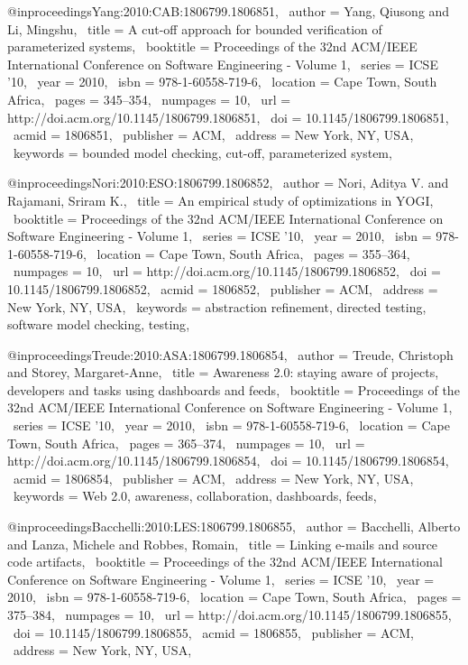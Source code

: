@inproceedings{Yang:2010:CAB:1806799.1806851,
 author = {Yang, Qiusong and Li, Mingshu},
 title = {A cut-off approach for bounded verification of parameterized systems},
 booktitle = {Proceedings of the 32nd ACM/IEEE International Conference on Software Engineering - Volume 1},
 series = {ICSE '10},
 year = {2010},
 isbn = {978-1-60558-719-6},
 location = {Cape Town, South Africa},
 pages = {345--354},
 numpages = {10},
 url = {http://doi.acm.org/10.1145/1806799.1806851},
 doi = {10.1145/1806799.1806851},
 acmid = {1806851},
 publisher = {ACM},
 address = {New York, NY, USA},
 keywords = {bounded model checking, cut-off, parameterized system},
} 

@inproceedings{Nori:2010:ESO:1806799.1806852,
 author = {Nori, Aditya V. and Rajamani, Sriram K.},
 title = {An empirical study of optimizations in YOGI},
 booktitle = {Proceedings of the 32nd ACM/IEEE International Conference on Software Engineering - Volume 1},
 series = {ICSE '10},
 year = {2010},
 isbn = {978-1-60558-719-6},
 location = {Cape Town, South Africa},
 pages = {355--364},
 numpages = {10},
 url = {http://doi.acm.org/10.1145/1806799.1806852},
 doi = {10.1145/1806799.1806852},
 acmid = {1806852},
 publisher = {ACM},
 address = {New York, NY, USA},
 keywords = {abstraction refinement, directed testing, software model checking, testing},
} 

@inproceedings{Treude:2010:ASA:1806799.1806854,
 author = {Treude, Christoph and Storey, Margaret-Anne},
 title = {Awareness 2.0: staying aware of projects, developers and tasks using dashboards and feeds},
 booktitle = {Proceedings of the 32nd ACM/IEEE International Conference on Software Engineering - Volume 1},
 series = {ICSE '10},
 year = {2010},
 isbn = {978-1-60558-719-6},
 location = {Cape Town, South Africa},
 pages = {365--374},
 numpages = {10},
 url = {http://doi.acm.org/10.1145/1806799.1806854},
 doi = {10.1145/1806799.1806854},
 acmid = {1806854},
 publisher = {ACM},
 address = {New York, NY, USA},
 keywords = {Web 2.0, awareness, collaboration, dashboards, feeds},
} 

@inproceedings{Bacchelli:2010:LES:1806799.1806855,
 author = {Bacchelli, Alberto and Lanza, Michele and Robbes, Romain},
 title = {Linking e-mails and source code artifacts},
 booktitle = {Proceedings of the 32nd ACM/IEEE International Conference on Software Engineering - Volume 1},
 series = {ICSE '10},
 year = {2010},
 isbn = {978-1-60558-719-6},
 location = {Cape Town, South Africa},
 pages = {375--384},
 numpages = {10},
 url = {http://doi.acm.org/10.1145/1806799.1806855},
 doi = {10.1145/1806799.1806855},
 acmid = {1806855},
 publisher = {ACM},
 address = {New York, NY, USA},
} 

